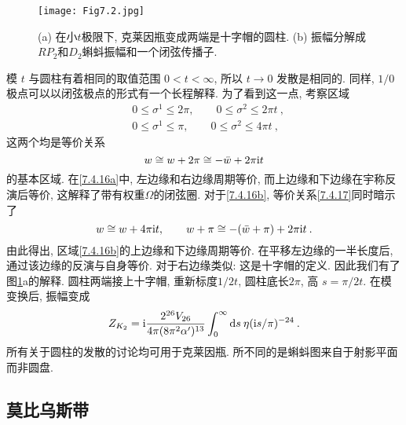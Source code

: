\begin{figure}[h]
	\begin{center}
		\texttt{[image: Fig7.2.jpg]}\\
		\caption{(a) 在小$t$极限下, 克莱因瓶变成两端是十字帽的圆柱. (b) 振幅分解成$R P_{2}$和$D_{2}$蝌蚪振幅和一个闭弦传播子.}\label{Fig7.2}
	\end{center}
\end{figure}

模 $t$ 与圆柱有着相同的取值范围 $0<t<\infty$, 所以 $t \rightarrow 0$ 发散是相同的. 同样, $1 / 0$极点可以以闭弦极点的形式有一个长程解释. 为了看到这一点, 
考察区域
\begin{subequations} \label{7.4.16}
\begin{align}
&0 \leq \sigma^{1} \leq 2 \pi, \qquad 0 \leq \sigma^{2} \leq 2 \pi t  \:, \label{7.4.16a} \\
&0 \leq \sigma^{1} \leq \pi, \qquad 0 \leq \sigma^{2} \leq 4 \pi t \:, \label{7.4.16b}
\end{align}		
\end{subequations}
这两个均是等价关系
\begin{equation}
	w \cong w+2 \pi \cong-\bar{w}+2 \pi \mathrm{i} t \label{7.4.17}
\end{equation}
的基本区域. 在\eqref{7.4.16a}中, 左边缘和右边缘周期等价, 而上边缘和下边缘在宇称反演后等价, 这解释了带有权重$\Omega $的闭弦圈. 
对于\eqref{7.4.16b}, 等价关系\eqref{7.4.17}同时暗示了
\begin{equation}
	w \cong w+4 \pi \mathrm{i} t, \qquad w+\pi \cong-(\bar{w}+\pi)+2 \pi \mathrm{i} t \:. \label{7.4.18}
\end{equation}
由此得出, 区域\eqref{7.4.16b}的上边缘和下边缘周期等价. 在平移左边缘的一半长度后, 通过该边缘的反演与自身等价. 对于右边缘类似: 这是十字帽的定义. 
因此我们有了图\ref{Fig7.2}a的解释. 圆柱两端接上十字帽, 重新标度$1 / 2 t$, 圆柱底长$2 \pi$, 高 $s=\pi / 2 t$. 在模变换后, 振幅变成
\begin{equation}
	Z_{K_{2}}=\mathrm{i} \frac{2^{26} V_{26}}{4 \pi(8 \pi^{2} \alpha^{\prime})^{13}} \int_{0}^{\infty} \mathrm{d} s\: \eta(\mathrm{i} s / \pi)^{-24} \:. \label{7.4.19}
\end{equation}
所有关于圆柱的发散的讨论均可用于克莱因瓶. 所不同的是蝌蚪图来自于射影平面而非圆盘.


\subsection*{莫比乌斯带}

